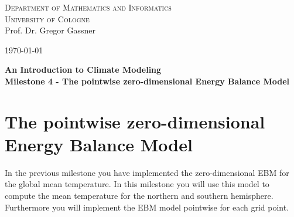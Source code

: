 \documentclass[10pt]{scrartcl}
\begin{document}
\begin{minipage}{.5\textwidth}
{\scshape Department of Mathematics and Informatics \\
University of Cologne\\}
\small Prof. Dr. Gregor Gassner \\
\end{minipage}
\hfill
\begin{minipage}{.3\textwidth}
\begin{flushright}
\today
\end{flushright}
\end{minipage}

\begin{center}
{\Large\bfseries
An Introduction to Climate Modeling}\\
\vspace{0.2cm}
{\bfseries Milestone 4 - The pointwise zero-dimensional Energy Balance Model}
\end{center}



\section{The pointwise zero-dimensional Energy Balance Model}
 In the previous milestone you have implemented the zero-dimensional EBM for the global mean temperature. In this milestone you will use this model to compute the mean temperature for the northern and southern hemisphere. Furthermore you will implement the EBM model pointwise for each grid point.
\end{document}
